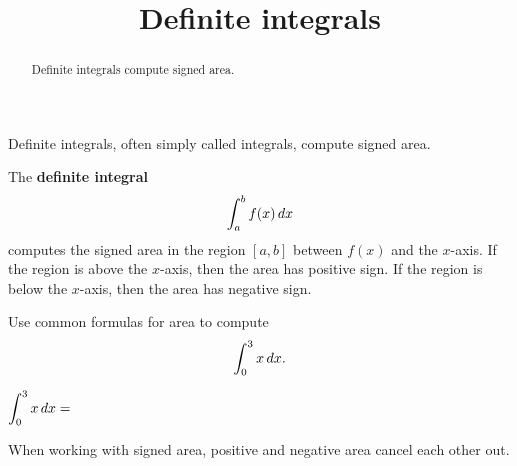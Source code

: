 \documentclass{ximera}
\title{Definite integrals}
\begin{document}
\begin{abstract}
  Definite integrals compute signed area.
\end{abstract}

\maketitle

Definite integrals, often simply called integrals, compute signed area. 

\begin{definition}
The \textbf{definite integral}
\[
\int_a^b f(x) \,d x
\]
computes the signed area in the region $[a,b]$ between $f(x)$ and the
$x$-axis. If the region is above the $x$-axis, then the area has
positive sign. If the region is below the $x$-axis, then the area has
negative sign.
\end{definition}




\begin{question}
Use common formulas for area to compute
\[
\int_0^3 x \,d x.
\]


$\displaystyle\int_0^3 x \,d x =$ 
\end{question}



When working with signed area, positive and negative area cancel each
other out.
\end{document}
